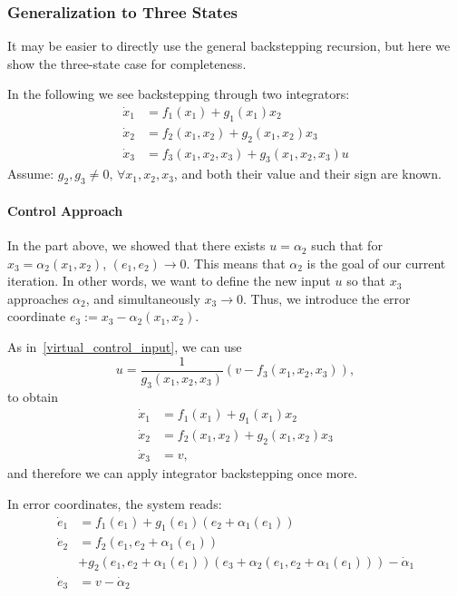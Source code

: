 \subsubsection{Generalization to Three States}\label{three_state_bs}


It may be easier to directly use the general backstepping recursion, but here we show the three-state case for completeness.

\newpar{}

In the following we see backstepping through two integrators:
\begin{align*}
    \dot{x}_1 & = f_1(x_1) + g_1(x_1)x_2                   \\
    \dot{x}_2 & = f_2(x_1, x_2) + g_2(x_1, x_2)x_3         \\
    \dot{x}_3 & = f_3(x_1, x_2, x_3) + g_3(x_1, x_2, x_3)u
\end{align*}
Assume: $g_2, g_3 \ne 0, \, \forall x_1, x_2, x_3$, and both their value and their sign are known.
\paragraph{Control Approach}

In the part above, we showed that there exists $u=\alpha_2$ such that for $x_3 = \alpha_2(x_1, x_2)$, $(e_1, e_2) \to 0$. This means that $\alpha_2$ is the goal of our current iteration.
\newpar{}
In other words, we want to define the new input $u$ so that $x_3$ approaches $\alpha_2$, and simultaneously $x_3 \to 0$. Thus, we introduce the error coordinate $e_3 := x_3 - \alpha_2(x_1, x_2)$.
\newpar{}

As in~\ref{virtual_control_input}, we can use
\begin{equation*}
    u = \frac{1}{g_3(x_1, x_2, x_3)}\left(v - f_3(x_1, x_2, x_3)\right),
\end{equation*}
to obtain
\begin{align*}
    \dot{x}_1 & = f_1(x_1) + g_1(x_1)x_2           \\
    \dot{x}_2 & = f_2(x_1, x_2) + g_2(x_1, x_2)x_3 \\
    \dot{x}_3 & = v,
\end{align*}
and therefore we can apply integrator backstepping once more.

\newpar{}

In error coordinates, the system reads:
\begin{align*}
    \dot{e}_1 & = f_1(e_1) + g_1(e_1)(e_2 + \alpha_1(e_1))                                                 \\
    \dot{e}_2 & = f_2(e_1, e_2 + \alpha_1(e_1))                                                            \\
              & + g_2(e_1, e_2 + \alpha_1(e_1))(e_3 + \alpha_2(e_1, e_2 + \alpha_1(e_1))) - \dot{\alpha}_1 \\
    \dot{e}_3 & = v - \dot{\alpha}_2
\end{align*}
\newpar{}

